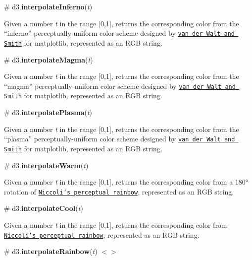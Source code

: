\label{_interpolateInferno}%
\# d3.{\bfseries interpolate\+Inferno}({\itshape t})



Given a number {\itshape t} in the range \mbox{[}0,1\mbox{]}, returns the corresponding color from the “inferno” perceptually-\/uniform color scheme designed by \href{https://bids.github.io/colormap/}{\tt van der Walt and Smith} for matplotlib, represented as an R\+GB string.

\label{_interpolateMagma}%
\# d3.{\bfseries interpolate\+Magma}({\itshape t})



Given a number {\itshape t} in the range \mbox{[}0,1\mbox{]}, returns the corresponding color from the “magma” perceptually-\/uniform color scheme designed by \href{https://bids.github.io/colormap/}{\tt van der Walt and Smith} for matplotlib, represented as an R\+GB string.

\label{_interpolatePlasma}%
\# d3.{\bfseries interpolate\+Plasma}({\itshape t})



Given a number {\itshape t} in the range \mbox{[}0,1\mbox{]}, returns the corresponding color from the “plasma” perceptually-\/uniform color scheme designed by \href{https://bids.github.io/colormap/}{\tt van der Walt and Smith} for matplotlib, represented as an R\+GB string.

\label{_interpolateWarm}%
\# d3.{\bfseries interpolate\+Warm}({\itshape t})



Given a number {\itshape t} in the range \mbox{[}0,1\mbox{]}, returns the corresponding color from a 180° rotation of \href{https://mycarta.wordpress.com/2013/02/21/perceptual-rainbow-palette-the-method/}{\tt Niccoli’s perceptual rainbow}, represented as an R\+GB string.

\label{_interpolateCool}%
\# d3.{\bfseries interpolate\+Cool}({\itshape t})



Given a number {\itshape t} in the range \mbox{[}0,1\mbox{]}, returns the corresponding color from \href{https://mycarta.wordpress.com/2013/02/21/perceptual-rainbow-palette-the-method/}{\tt Niccoli’s perceptual rainbow}, represented as an R\+GB string.

\label{_interpolateRainbow}%
\# d3.{\bfseries interpolate\+Rainbow}({\itshape t}) \href{https://github.com/d3/d3-scale/blob/master/src/rainbow.js}{\tt $<$$>$}



